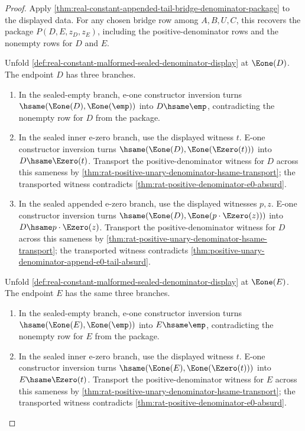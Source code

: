 \begin{proof}
Apply
\autoref{thm:real-constant-appended-tail-bridge-denominator-package} to the
displayed data. For any chosen bridge row among $A,B,U,C$, this recovers the
package $P(D,E,z_D,z_E)$, including the positive-denominator rows and the
nonempty rows for $D$ and $E$.

Unfold
\autoref{def:real-constant-malformed-sealed-denominator-display} at
$\Eone(D)$. The endpoint $D$ has three branches.
\begin{enumerate}
  \item In the sealed-empty branch, e-one constructor inversion turns
  $\hsame(\Eone(D),\Eone(\emp))$ into $D\hsame\emp$, contradicting the
  nonempty row for $D$ from the package.

  \item In the sealed inner e-zero branch, use the displayed witness $t$.
  E-one constructor inversion turns
  $\hsame(\Eone(D),\Eone(\Ezero(t)))$ into $D\hsame\Ezero(t)$. Transport the
  positive-denominator witness for $D$ across this sameness by
  \autoref{thm:rat-positive-unary-denominator-hsame-transport}; the
  transported witness contradicts
  \autoref{thm:rat-positive-denominator-e0-absurd}.

  \item In the sealed appended e-zero branch, use the displayed witnesses
  $p,z$. E-one constructor inversion turns
  $\hsame(\Eone(D),\Eone(p\cdot\Ezero(z)))$ into
  $D\hsame p\cdot\Ezero(z)$. Transport the positive-denominator witness for
  $D$ across this sameness by
  \autoref{thm:rat-positive-unary-denominator-hsame-transport}; the
  transported witness contradicts
  \autoref{thm:positive-unary-denominator-append-e0-tail-absurd}.
\end{enumerate}

Unfold
\autoref{def:real-constant-malformed-sealed-denominator-display} at
$\Eone(E)$. The endpoint $E$ has the same three branches.
\begin{enumerate}
  \item In the sealed-empty branch, e-one constructor inversion turns
  $\hsame(\Eone(E),\Eone(\emp))$ into $E\hsame\emp$, contradicting the
  nonempty row for $E$ from the package.

  \item In the sealed inner e-zero branch, use the displayed witness $t$.
  E-one constructor inversion turns
  $\hsame(\Eone(E),\Eone(\Ezero(t)))$ into $E\hsame\Ezero(t)$. Transport the
  positive-denominator witness for $E$ across this sameness by
  \autoref{thm:rat-positive-unary-denominator-hsame-transport}; the
  transported witness contradicts
  \autoref{thm:rat-positive-denominator-e0-absurd}.


\end{enumerate}
\end{proof}

